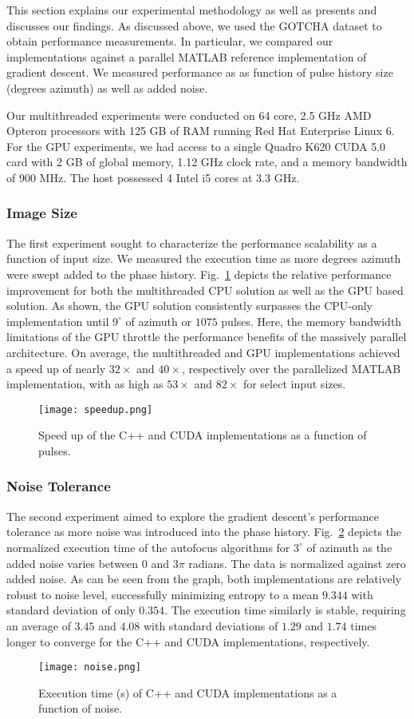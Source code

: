 This section explains our experimental methodology as well as presents and
discusses our findings. As discussed above, we used the GOTCHA dataset to
obtain performance measurements. In particular, we compared our implementations
against a parallel MATLAB reference implementation of gradient descent. We
measured performance as as function of pulse history size (degrees azimuth) as
well as added noise.

Our multithreaded experiments were conducted on 64 core, 2.5 GHz AMD Opteron
processors with 125 GB of RAM running Red Hat Enterprise Linux 6. For the GPU
experiments, we had access to a single Quadro K620 CUDA 5.0 card with 2 GB of
global memory, 1.12 GHz clock rate, and a memory bandwidth of 900 MHz. The host
possessed 4 Intel i5 cores at 3.3 GHz.

\subsubsection{Image Size}

The first experiment sought to characterize the performance scalability as a
function of input size. We measured the execution time as more degrees azimuth
were swept added to the phase history. Fig.~\ref{fig:speedup} depicts the
relative performance improvement for both the multithreaded CPU solution as well
as the GPU based solution. As shown, the GPU solution consistently surpasses the
CPU-only implementation until $9^{\circ}$ of azimuth or $1075$ pulses. Here, the
memory bandwidth limitations of the GPU throttle the performance benefits of the
massively parallel architecture. On average, the multithreaded and GPU
implementations achieved a speed up of nearly $32\times$ and $40\times$, respectively over
the parallelized MATLAB implementation, with as high as $53\times$ and $82\times$ for select
input sizes.

\begin{figure}
  \centering
  \texttt{[image: speedup.png]}
  \vspace{5 mm}
  \caption{Speed up of the C++ and CUDA implementations as a function of pulses.}
  \label{fig:speedup}
\end{figure}

\subsubsection{Noise Tolerance}

The second experiment aimed to explore the gradient descent's performance
tolerance as more noise was introduced into the phase history.
Fig.~\ref{fig:noise} depicts the normalized execution time of the
autofocus algorithms for $3^{\circ}$ of azimuth as the added noise varies
between $0$ and $3\pi$ radians. The data is normalized against zero added noise.
As can be seen from the graph, both implementations are relatively robust to
noise level, successfully minimizing entropy to a mean $9.344$ with standard
deviation of only $0.354$. The execution time similarly is stable, requiring an
average of $3.45$ and $4.08$ with standard deviations of $1.29$ and $1.74$ times
longer to converge for the C++ and CUDA implementations, respectively.

\begin{figure}
  \centering
  \texttt{[image: noise.png]}
  \vspace{5 mm}
  \caption{Execution time (s) of C++ and CUDA implementations as a function of
  noise.}
  \label{fig:noise}
\end{figure}
